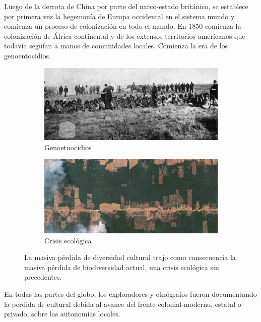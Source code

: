 \documentclass[a4paper,10pt]{book}
\theoremstyle{definition}
\begin{document}

Luego de la derrota de China por parte del narco-estado brit\'anico, se establece por primera vez la hegemon\'ia de Europa occidental en el sistema mundo y comienza un proceso de colonizaci\'on en todo el mundo.
En 1850 comienza la colonizaci\'on de África continental y de los extensos territorios americanos que todav\'ia segu\'ian a manos de comunidades locales.
Comienza la era de los genoentocidios.
\begin{figure}[ht!]
    \centering
    \begin{subfigure}[b]{0.48\textwidth}
    \includegraphics[width=\linewidth]{static/genocidio_patagonia}
    \caption{Genoetnocidios}
    \label{fig:genocidio_patagonia}
    \end{subfigure}
    \begin{subfigure}[b]{0.47\textwidth}
    \includegraphics[width=\linewidth]{static/deforestation-brazil}
    \caption{Crisis ecol\'ogica}
    \label{fig:deforestation-brazil}
    \end{subfigure}
    \caption{
    La masiva p\'erdida de diversidad cultural trajo como consecuencia la masiva p\'erdida de biodiversidad actual, una crisis ecol\'ogica sin precedentes.
    }
    \label{fig:cultural-lose}
\end{figure}
En todas las partes del globo, los exploradores y etn\'ografos fueron documentando la perdida de cultural debida al avance del frente colonial-moderno, estatal o privado, sobre las autonom\'ias locales.
\end{document}
